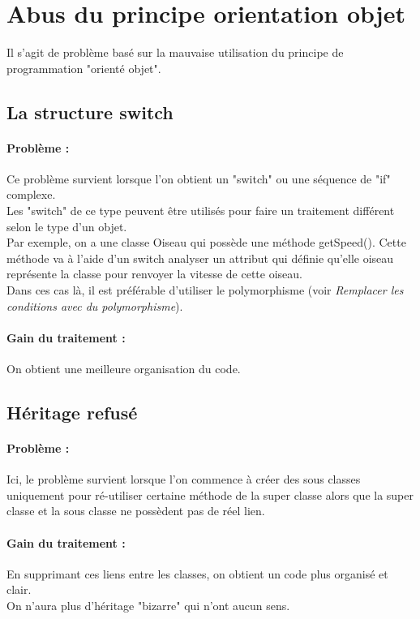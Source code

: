 \documentclass[a4paper,twoside,12pt,openright]{report}
\begin{document}
\section{Abus du principe orientation objet}
Il s'agit de problème basé sur la mauvaise utilisation du principe de programmation "orienté objet".\\

\subsection{La structure switch}
\paragraph{Problème :}
Ce problème survient lorsque l'on obtient un "switch" ou une séquence de "if" complexe.\\
Les "switch" de ce type peuvent être utilisés pour faire un traitement différent selon le type d'un objet.\\
Par exemple, on a une classe Oiseau qui possède une méthode getSpeed(). Cette méthode va à l'aide d'un switch analyser un attribut qui définie qu'elle oiseau représente la classe pour renvoyer la vitesse de cette oiseau.\\
Dans ces cas là, il est préférable d'utiliser le polymorphisme (voir \textit{Remplacer les conditions avec du polymorphisme}).

\paragraph{Gain du traitement :}
On obtient une meilleure organisation du code.\\

\subsection{Héritage refusé}
\paragraph{Problème :}
Ici, le problème survient lorsque l'on commence à créer des sous classes uniquement pour ré-utiliser certaine méthode de la super classe alors que la super classe et la sous classe ne possèdent pas de réel lien.\\


\paragraph{Gain du traitement :}
En supprimant ces liens entre les classes, on obtient  un code plus organisé et clair.\\
On n'aura plus d'héritage "bizarre" qui n'ont aucun sens.\\
\end{document}
